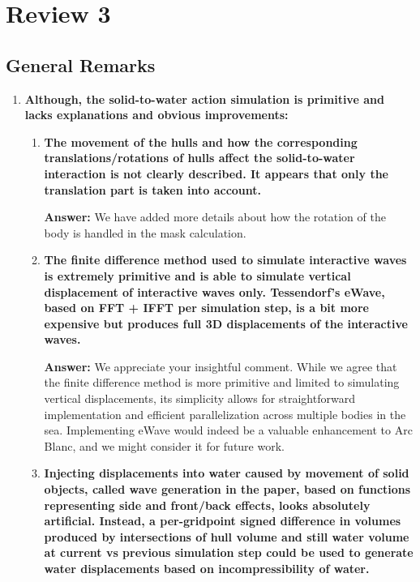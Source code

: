 \documentclass{article}
\newcommand{\answer}[1]{\textbf{\textcolor{answercolor}{Answer:}} \textcolor{answercolor}{#1}}
\begin{document}
\section*{Review 3}

\subsection*{General Remarks}

\begin{enumerate}[label=\textbf{\arabic*.}]
	\item \textbf{Although, the solid-to-water action simulation is primitive and lacks explanations and obvious improvements:}

	      \begin{enumerate}[label=\textbf{\arabic*.}]
		      \item \textbf{The movement of the hulls and how the corresponding translations/rotations of hulls affect the solid-to-water interaction is not clearly described. It appears that only the translation part is taken into account.}

		            \answer{We have added more details about how the rotation of the body is handled in the mask calculation.}

		      \item \textbf{The finite difference method used to simulate interactive waves is extremely primitive and is able to simulate vertical displacement of interactive waves only. Tessendorf's eWave, based on FFT + IFFT per simulation step, is a bit more expensive but produces full 3D displacements of the interactive waves.}

		            \answer{We appreciate your insightful comment. While we agree that the finite difference method is more primitive and limited to simulating vertical displacements, its simplicity allows for straightforward implementation and efficient parallelization across multiple bodies in the sea. Implementing eWave would indeed be a valuable enhancement to Arc Blanc, and we might consider it for future work.}

		      \item \textbf{Injecting displacements into water caused by movement of solid objects, called wave generation in the paper, based on functions representing side and front/back effects, looks absolutely artificial. Instead, a per-gridpoint signed difference in volumes produced by intersections of hull volume and still water volume at current vs previous simulation step could be used to generate water displacements based on incompressibility of water.}


\end{enumerate}
\end{enumerate}
\end{document}
